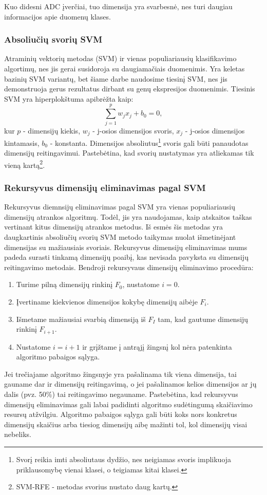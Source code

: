 Kuo didesni ADC įverčiai, tuo dimensija yra svarbesnė, nes turi daugiau
informacijos apie duomenų klases.

\subsubsection{Absoliučių svorių SVM}

Atraminių vektorių metodas (SVM) ir vienas populiariausių klasifikavimo algortimų,
nes jis gerai susidoroja su daugiamačiais duomenimis. Yra keletas bazinių 
SVM variantų, bet šiame darbe naudosime tiesinį SVM, nes jis demonstruoja
gerus rezultatus dirbant su genų ekspresijos duomenimis. Tiesinis SVM yra
hiperplokštuma apibrėžta kaip:
\begin{equation}
 \sum_{j=1}^{p}{w_jx_j + b_0 = 0},
\end{equation}
kur $p$ - dimensijų kiekis, $w_j$ - j-osios dimensijos svoris, $x_j$ - j-osios
dimensijos kintamasis, $b_0$ - konstanta. Dimensijos absoliutus\footnote{Svorį
reikia imti absoliutaus dydžio, nes neigiamas svoris implikuoja priklausomybę 
vienai klasei, o teigiamas kitai klasei.} svoris gali būti panaudotas
dimensijų reitingavimui. Pastebėtina, kad svorių nustatymas yra atliekamas tik 
vieną kartą\footnote{SVM-RFE - metodas svorius nustato daug kartų.}.

\subsubsection{Rekursyvus dimensijų eliminavimas pagal SVM}

Rekursyvus diemnsijų eliminavimas pagal SVM yra vienas populiariausių dimensijų
atrankos algoritmų. Todėl, jis yra naudojamas, kaip atskaitos taškas vertinant
kitus dimensijų atrankos metodus. Iš esmės šis metodas yra daugkartinis 
absoliučių svorių SVM metodo taikymas nuolat išmetinėjant dimensijas su 
mažiausiais svoriais. Rekursyvus dimensijų eliminavimas mums padeda surasti 
tinkamą dimensijų poaibį, kas nevisada pavyksta su dimensijų reitingavimo 
metodais. Bendroji rekursyvaus dimensijų eliminavimo procedūra:
\begin{enumerate}
 \item Turime pilną dimensijų rinkinį $F_0$, nustatome $i=0$.
 \item Įvertiname kiekvienos dimensijos kokybę dimensijų aibėje $F_i$.
 \item Išmetame mažiausiai svarbią dimensiją iš $F_I$ tam, kad gautume
 dimensijų rinkinį $F_{i+1}$.
 \item Nustatome $i=i+1$ ir grįžtame į antrąjį žingsnį kol nėra patenkinta 
 algoritmo pabaigos sąlyga.
\end{enumerate}
Jei trečiajame algoritmo žingsnyje yra pašalinama tik viena dimensija, tai gauname dar
ir dimensijų reitingavimą, o jei pašalinamos kelios dimensijos ar jų dalis
(pvz. 50\%) tai reitingavimo negauname. Pastebėtina, kad rekursyvus dimensijų
eliminavimas gali labai padidinti algoritmo sudėtingumą skaičiavimo resursų
atžvilgiu. Algoritmo pabaigos sąlyga gali būti koks nors konkretus dimensijų
skaičius arba tiesiog dimensijų aibę mažinti tol, kol dimensijų visai nebeliks.


